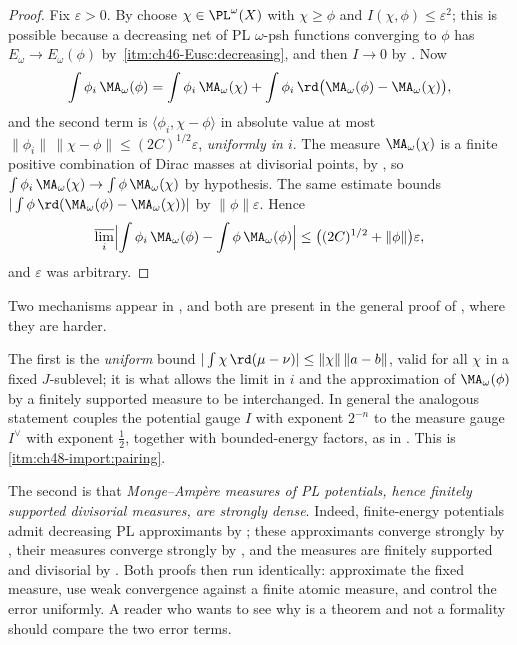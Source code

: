 \begin{proof}
Fix $\varepsilon>0$.  By  choose
$\chi\in\PL^\omega(X)$ with $\chi\ge\phi$ and
$I(\chi,\phi)\le\varepsilon^2$; this is possible because a decreasing net
of PL $\omega$-psh functions converging to $\phi$ has
$E_\omega\to E_\omega(\phi)$ by
\,\cref{itm:ch46-Eusc:decreasing}, and then
$I\to0$ by .  Now
\[
 \int\phi_i\,\MA_\omega(\phi)
 =\int\phi_i\,\MA_\omega(\chi)
  +\int\phi_i\,\rd\bigl(\MA_\omega(\phi)-\MA_\omega(\chi)\bigr),
\]
and the second term is
$\langle\phi_i,\chi-\phi\rangle$ in absolute value at most
$\lVert\phi_i\rVert\,\lVert\chi-\phi\rVert\le(2C)^{1/2}\varepsilon$,
\emph{uniformly in $i$}.  The measure $\MA_\omega(\chi)$ is a finite
positive combination of Dirac masses at divisorial points, by
, so
$\int\phi_i\,\MA_\omega(\chi)\to\int\phi\,\MA_\omega(\chi)$ by
hypothesis.  The same estimate bounds
$|\int\phi\,\rd(\MA_\omega(\phi)-\MA_\omega(\chi))|$ by
$\lVert\phi\rVert\varepsilon$.  Hence
\[
 \varlimsup_i\Bigl|\int\phi_i\,\MA_\omega(\phi)
   -\int\phi\,\MA_\omega(\phi)\Bigr|
 \le\bigl((2C)^{1/2}+\lVert\phi\rVert\bigr)\varepsilon,
\]
and $\varepsilon$ was arbitrary.
\end{proof}

\begin{remark}
\label{rem:ch48-curve-isolates}
Two mechanisms appear in , and both are
present in the general proof of \cite[Theorem~12.4]{BJ22}, where they are
harder.

The first is the \emph{uniform} bound
$|\int\chi\,\rd(\mu-\nu)|\le\lVert\chi\rVert\,\lVert a-b\rVert$, valid for
all $\chi$ in a fixed $J$-sublevel; it is what allows the limit in
$i$ and the approximation of $\MA_\omega(\phi)$ by a finitely supported
measure to be interchanged.  In general the analogous statement couples the
potential gauge $I$ with exponent $2^{-n}$ to the measure gauge
$I^\vee$ with exponent $\tfrac12$, together with bounded-energy
factors, as in \cite[Theorem~10.3]{BJ22}. This is
\,\cref{itm:ch48-import:pairing}.

The second is that \emph{Monge--Amp\`ere measures of PL potentials, hence
finitely supported divisorial measures, are strongly dense}.  Indeed,
finite-energy potentials admit decreasing PL approximants by
; these approximants converge strongly by
, their measures converge strongly by
, and the measures are finitely supported
and divisorial by .  Both proofs then run identically:
approximate the fixed measure, use weak convergence against a finite atomic
measure, and control the error uniformly.  A reader who wants to see why
 is a theorem and not a formality should
compare the two error terms.
\end{remark}

